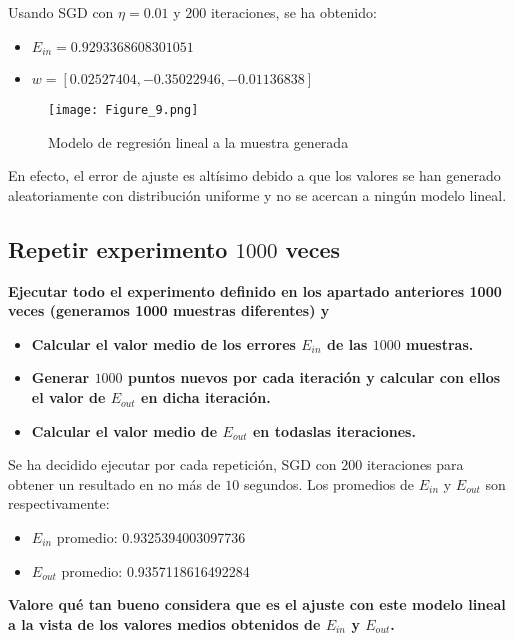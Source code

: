 Usando SGD con $\eta = 0.01$ y $200$ iteraciones, se ha obtenido:

\begin{itemize}
\item $E_{in} = 0.9293368608301051$
\item $w = [0.02527404, -0.35022946, -0.01136838]$
\end{itemize}

\begin{figure}[H]
\centering
\texttt{[image: Figure\_9.png]}
\caption{Modelo de regresión lineal a la muestra generada}
\end{figure}
  
En efecto, el error de ajuste es altísimo debido a que los valores se han
generado aleatoriamente con distribución uniforme y no se acercan a ningún
modelo lineal.

\subsection{Repetir experimento $1000$ veces}

\textbf{Ejecutar todo el experimento definido en los apartado anteriores 1000
veces (generamos 1000 muestras diferentes) y}

\begin{itemize}
  \item \textbf{Calcular el valor medio de los errores $E_{in}$ de las $1000$ muestras.}
  \item \textbf{Generar $1000$ puntos nuevos por cada iteración y calcular con ellos el
  valor de $E_{out}$ en dicha iteración.}
  \item \textbf{Calcular el valor medio de $E_{out}$ en todaslas iteraciones.}
\end{itemize}

Se ha decidido ejecutar por cada repetición, SGD con $200$ iteraciones para
obtener un resultado en no más de $10$ segundos. Los promedios de $E_{in}$ y
$E_{out}$ son respectivamente:

\begin{itemize}
  \item $E_{in}$ promedio: 0.9325394003097736
  \item $E_{out}$ promedio: 0.9357118616492284 
\end{itemize}


\textbf{Valore qué tan bueno considera que es el ajuste con este modelo lineal a la vista de los
valores medios obtenidos de $E_{in}$ y $E_{out}$.}

